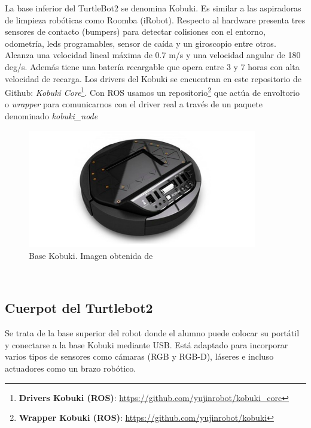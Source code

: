 La base inferior del TurtleBot2 se denomina Kobuki. Es similar a las aspiradoras de limpieza robóticas como Roomba (iRobot). Respecto al hardware presenta tres sensores de contacto (bumpers) para detectar colisiones con el entorno, odometría, leds programables, sensor de caída y un giroscopio entre otros. Alcanza una velocidad lineal máxima de 0.7 m/s y una velocidad angular de 180 deg/s. Además tiene una batería recargable que opera entre 3 y 7 horas con alta velocidad de recarga. Los drivers del Kobuki se encuentran en este repositorio de Github: \textit{Kobuki Core}\footnote{\textbf{Drivers Kobuki (ROS)}: \url{https://github.com/yujinrobot/kobuki_core}}. Con ROS usamos un repositorio\footnote{\textbf{Wrapper Kobuki (ROS)}: \url{https://github.com/yujinrobot/kobuki}} que actúa de envoltorio o \textit{wrapper} para comunicarnos con el driver real a través de un paquete denominado \textit{kobuki\_node}
\begin{figure} [H]
	\begin{center}
	\includegraphics[width=10cm]{imagenes/cap3/base-kobuki.png}
	\end{center}
	\caption[Base Kobuki]{Base Kobuki. Imagen obtenida de \cite{kobuki}}
	\label{fig:kobuki_real}
\end{figure}\

\subsection{Cuerpot del Turtlebot2}
\label{subsec:turtlebot2_cuerpo}

Se trata de la base superior del robot donde el alumno puede colocar su portátil y conectarse a la base Kobuki mediante USB. Está adaptado para incorporar varios tipos de sensores como cámaras (RGB y RGB-D), láseres e incluso actuadores como un brazo robótico.

